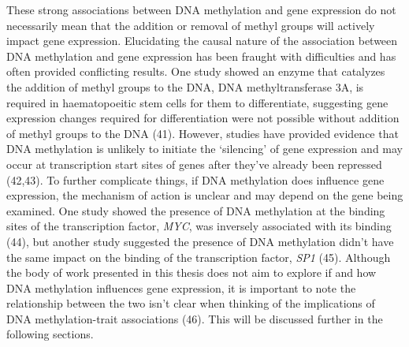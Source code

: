 \documentclass[11pt,oneside]{bristolthesis}
\begin{document}
These strong associations between DNA methylation and gene expression do not necessarily mean that the addition or removal of methyl groups will actively impact gene expression. Elucidating the causal nature of the association between DNA methylation and gene expression has been fraught with difficulties and has often provided conflicting results. One study showed an enzyme that catalyzes the addition of methyl groups to the DNA, DNA methyltransferase 3A, is required in haematopoeitic stem cells for them to differentiate, suggesting gene expression changes required for differentiation were not possible without addition of methyl groups to the DNA (41). However, studies have provided evidence that DNA methylation is unlikely to initiate the `silencing' of gene expression and may occur at transcription start sites of genes after they've already been repressed (42,43). To further complicate things, if DNA methylation does influence gene expression, the mechanism of action is unclear and may depend on the gene being examined. One study showed the presence of DNA methylation at the binding sites of the transcription factor, \emph{MYC}, was inversely associated with its binding (44), but another study suggested the presence of DNA methylation didn't have the same impact on the binding of the transcription factor, \emph{SP1} (45). Although the body of work presented in this thesis does not aim to explore if and how DNA methylation influences gene expression, it is important to note the relationship between the two isn't clear when thinking of the implications of DNA methylation-trait associations (46). This will be discussed further in the following sections.
\end{document}
